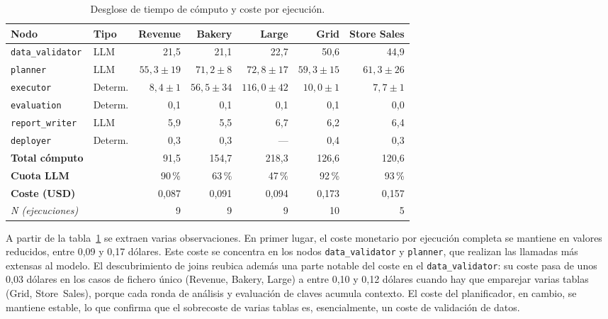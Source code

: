 \documentclass[12pt,a4paper]{article}
\theoremstyle{plain}
\begin{document}
\begin{table}[H]
\centering
\small
\setlength{\tabcolsep}{4pt}
\begin{tabular}{llrrrrr}
\toprule
\textbf{Nodo} & \textbf{Tipo}
  & \textbf{Revenue} & \textbf{Bakery} & \textbf{Large} & \textbf{Grid} & \textbf{Store Sales} \\
\midrule
\texttt{data\_validator} & LLM    & 21,5 & 21,1 & 22,7 & 50,6 & 44,9 \\
\texttt{planner}         & LLM    & $55{,}3{\pm}19$ & $71{,}2{\pm}8$ & $72{,}8{\pm}17$ & $59{,}3{\pm}15$ & $61{,}3{\pm}26$ \\
\texttt{executor}        & Determ.& $8{,}4{\pm}1$ & $56{,}5{\pm}34$ & $116{,}0{\pm}42$ & $10{,}0{\pm}1$ & $7{,}7{\pm}1$ \\
\texttt{evaluation}      & Determ.& 0,1 & 0,1 & 0,1 & 0,1 & 0,0 \\
\texttt{report\_writer}  & LLM    & 5,9 & 5,5 & 6,7 & 6,2 & 6,4 \\
\texttt{deployer}        & Determ.& 0,3 & 0,3 & — & 0,4 & 0,3 \\
\midrule
\textbf{Total cómputo}   &        & 91,5 & 154,7 & 218,3 & 126,6 & 120,6 \\
\textbf{Cuota LLM}       &        & 90\,\% & 63\,\% & 47\,\% & 92\,\% & 93\,\% \\
\midrule
\textbf{Coste (USD)}     &        & 0,087 & 0,091 & 0,094 & 0,173 & 0,157 \\
\midrule
\multicolumn{2}{l}{\textit{N (ejecuciones)}} & 9 & 9 & 9 & 10 & 5 \\
\bottomrule
\end{tabular}
\caption{Desglose de tiempo de cómputo y coste por ejecución.}
\label{tab:coste-desglose}
\end{table}


A partir de la tabla~\ref{tab:coste-desglose} se extraen varias observaciones. En primer lugar,
el coste monetario por ejecución completa se mantiene en valores reducidos, entre 0,09 y 0,17
dólares. Este coste se concentra en los nodos \texttt{data\_validator} y \texttt{planner}, que
realizan las llamadas más extensas al modelo. El descubrimiento de joins reubica además
una parte notable del coste en el \texttt{data\_validator}: su coste pasa de unos 0,03 dólares en
los casos de fichero único (Revenue, Bakery, Large) a entre 0,10 y 0,12 dólares cuando hay que
emparejar varias tablas (Grid, Store~Sales), porque cada ronda de análisis y evaluación de claves
acumula contexto. El coste del planificador, en cambio, se mantiene estable, lo que confirma que
el sobrecoste de varias tablas es, esencialmente, un coste de validación de datos.
\end{document}
